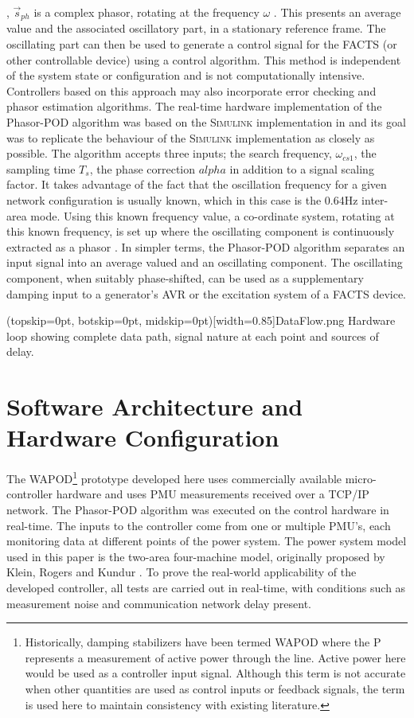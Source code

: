 \documentclass{ieeeaccess}
\begin{document}
, $\stackrel{\to }{s}_{ph}$ is a complex phasor, rotating at the frequency $\omega$ \cite{PhasorPOD}. This presents an average value and the associated oscillatory part, in a stationary reference frame. The oscillating part can then be used to generate a control signal for the FACTS (or other controllable device) using a control algorithm. This method is independent of the system state or configuration and is not computationally intensive. Controllers based on this approach may also incorporate error checking and phasor estimation algorithms. The real-time hardware implementation of the Phasor-POD algorithm was based on the \textsc{Simulink} implementation in \cite{PhasorPODImplement} and its goal was to replicate the behaviour of the \textsc{Simulink} implementation as closely as possible. The algorithm accepts three inputs; the search frequency, $\omega_{cs1}$, the sampling time $T_{s}$, the phase correction $alpha$ in addition to a signal scaling factor. It takes advantage of the fact that the oscillation frequency for a given network configuration is usually known, which in this case is the 0.64Hz inter-area mode. Using this known frequency value, a  co-ordinate system, rotating at this known frequency, is set up where the oscillating component is continuously extracted as a phasor \cite{PhasorPOD}. In simpler terms, the Phasor-POD algorithm separates an input signal into an average valued and an oscillating component. The oscillating component, when suitably phase-shifted, can be used as a supplementary damping input to a generator's AVR or the excitation system of a FACTS device.

\Figure[tbp](topskip=0pt, botskip=0pt, midskip=0pt)[width=0.85\textwidth]{DataFlow.png}
{Hardware loop showing complete data path, signal nature at each point and sources of delay.\label{Hardware_Outline}}

\section{Software Architecture and Hardware Configuration}\label{softhardware}

The WAPOD\footnote{Historically, damping stabilizers have been termed WAPOD where the P represents a measurement of active power through the line. Active power here would be used as a controller input signal. Although this term is not accurate when other quantities are used as control inputs or feedback signals, the term is used here to maintain consistency with existing literature.} prototype developed here uses commercially available micro-controller hardware and uses PMU measurements received over a TCP/IP network. The Phasor-POD algorithm \cite{PhasorPOD} was executed on the control hardware in real-time. The inputs to the controller come from one or multiple PMU's, each monitoring data at different points of the power system. The power system model used in this paper is the two-area four-machine model, originally proposed by Klein, Rogers and Kundur \cite{KundurTwoArea}. To prove the real-world applicability of the developed controller, all tests are carried out in real-time, with conditions such as measurement noise and communication network delay present.
\end{document}
